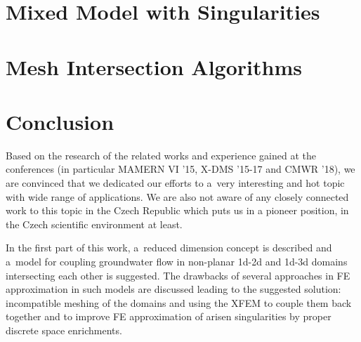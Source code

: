 \documentclass[bibliography=totocnumbered,dvipsnames,FM,Dis, EN]{tulthesis_autoreferat}
\begin{document}



\chapter{Mixed Model with Singularities} \label{chap:xfem_mh}







\chapter{Mesh Intersection Algorithms} \label{chap:intersections}





\chapter{Conclusion} \label{chap:summary}


Based on the research of the related works and experience gained at the conferences
(in particular MAMERN VI '15, X-DMS '15-17 and CMWR '18),
we are convinced that we dedicated our efforts to a~very interesting and hot topic with wide range of applications.
We are also not aware of any closely connected work to this topic in the Czech Republic
which puts us in a pioneer position, in the Czech scientific environment at least.

In the first part of this work, a~reduced dimension concept is described and a~model for coupling
groundwater flow in non-planar 1d-2d and 1d-3d domains intersecting each other is suggested. 
The drawbacks of several approaches in FE approximation in such models are discussed leading to
the suggested solution: incompatible meshing of the domains and using the XFEM to couple them back together and to improve
FE approximation of arisen singularities by proper discrete space enrichments.
\end{document}
